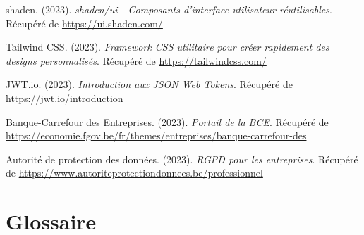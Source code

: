 \documentclass[12pt,a4paper]{report}
\begin{document}
\begin{thebibliography}{99}
shadcn. (2023).
\textit{shadcn/ui - Composants d'interface utilisateur réutilisables}.
Récupéré de \url{https://ui.shadcn.com/}

Tailwind CSS. (2023).
\textit{Framework CSS utilitaire pour créer rapidement des designs personnalisés}.
Récupéré de \url{https://tailwindcss.com/}

JWT.io. (2023).
\textit{Introduction aux JSON Web Tokens}.
Récupéré de \url{https://jwt.io/introduction}

Banque-Carrefour des Entreprises. (2023).
\textit{Portail de la BCE}.
Récupéré de \url{https://economie.fgov.be/fr/themes/entreprises/banque-carrefour-des}

Autorité de protection des données. (2023).
\textit{RGPD pour les entreprises}.
Récupéré de \url{https://www.autoriteprotectiondonnees.be/professionnel}

\end{thebibliography}

\chapter*{Glossaire}
\end{document}
